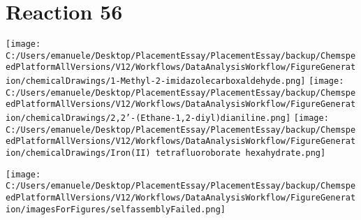 \documentclass{article}%
\begin{document}
\section*{Reaction 56}%
%
\begin{scheme}[H]%
\begin{minipage}{0.5\textwidth}%
\texttt{[image: C:/Users/emanuele/Desktop/PlacementEssay/PlacementEssay/backup/ChemspeedPlatformAllVersions/V12/Workflows/DataAnalysisWorkflow/FigureGeneration/chemicalDrawings/1-Methyl-2-imidazolecarboxaldehyde.png]}%
\texttt{[image: C:/Users/emanuele/Desktop/PlacementEssay/PlacementEssay/backup/ChemspeedPlatformAllVersions/V12/Workflows/DataAnalysisWorkflow/FigureGeneration/chemicalDrawings/2,2'-(Ethane-1,2-diyl)dianiline.png]}%
\texttt{[image: C:/Users/emanuele/Desktop/PlacementEssay/PlacementEssay/backup/ChemspeedPlatformAllVersions/V12/Workflows/DataAnalysisWorkflow/FigureGeneration/chemicalDrawings/Iron(II) tetrafluoroborate hexahydrate.png]}%
\end{minipage}%
\begin{minipage}{0.5\textwidth}%
\begin{center}%
\texttt{[image: C:/Users/emanuele/Desktop/PlacementEssay/PlacementEssay/backup/ChemspeedPlatformAllVersions/V12/Workflows/DataAnalysisWorkflow/FigureGeneration/imagesForFigures/selfassemblyFailed.png]}%
\end{center}%
\end{minipage}%
\caption{Self-assembly of components 12, 20, with Iron(II) in a 3.0:1.5:1.0 molar ratio in CH$_3$CN at 60\textdegree C for 40h. These are the reagents (starting materials) for reaction 56.}%
\end{scheme}%
\end{document}
